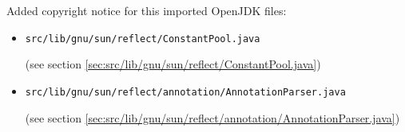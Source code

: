 \documentclass[a4paper, 10pt, titlepage]{scrartcl} %
\begin{document}
Added copyright notice for this imported OpenJDK files:
\begin{itemize}
 \item \begin{scriptsize}\verb|src|\hspace{0.0pt}\verb|/|\hspace{0.0pt}\verb|lib|\hspace{0.0pt}\verb|/|\hspace{0.0pt}\verb|gnu|\hspace{0.0pt}\verb|/|\hspace{0.0pt}\verb|sun|\hspace{0.0pt}\verb|/|\hspace{0.0pt}\verb|reflect|\hspace{0.0pt}\verb|/|\hspace{0.0pt}\verb|ConstantPool|\hspace{0.0pt}\verb|.|\hspace{0.0pt}\verb|java|\end{scriptsize} (see section \ref{sec:src/lib/gnu/sun/reflect/ConstantPool.java})
 \item \begin{scriptsize}\verb|src|\hspace{0.0pt}\verb|/|\hspace{0.0pt}\verb|lib|\hspace{0.0pt}\verb|/|\hspace{0.0pt}\verb|gnu|\hspace{0.0pt}\verb|/|\hspace{0.0pt}\verb|sun|\hspace{0.0pt}\verb|/|\hspace{0.0pt}\verb|reflect|\hspace{0.0pt}\verb|/|\hspace{0.0pt}\verb|annotation|\hspace{0.0pt}\verb|/|\hspace{0.0pt}\verb|AnnotationParser|\hspace{0.0pt}\verb|.|\hspace{0.0pt}\verb|java|\end{scriptsize} (see section \ref{sec:src/lib/gnu/sun/reflect/annotation/AnnotationParser.java})

\end{itemize}
\end{document}
